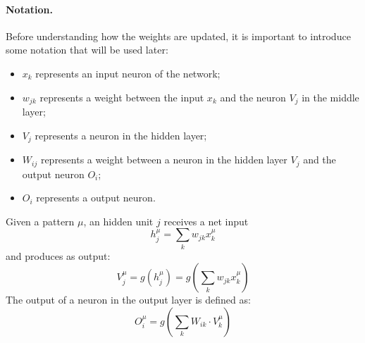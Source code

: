 \paragraph*{Notation.} Before understanding how the weights are updated, it is important to introduce some notation that will be used later:

\begin{itemize}
    \item $x_k$ represents an input neuron of the network;
    \item $w_{jk}$ represents a weight between the input $x_k$ and the neuron $V_j$ in the middle layer;
    \item $V_j$ represents a neuron in the hidden layer;
    \item $W_{ij}$ represents a weight between a neuron in the hidden layer $V_j$ and the output neuron $O_i$;
    \item $O_i$ represents a output neuron.
\end{itemize}


Given a pattern $\mu$, an hidden unit $j$ receives a net input
$$h _ { j } ^ { \mu } = \sum _ { k } w _ { j k } x _ { k } ^ { \mu }$$
and produces as output:
$$V _ { j } ^ { \mu } = g \left( h _ { j } ^ { \mu } \right) = g \left( \sum _ { k } w _ { j k } x _ { k } ^ { \mu } \right)$$
The output of a neuron in the output layer is defined as:
$$O _ {i} ^ {\mu} = g(\sum _ k W_{ik} \cdot V _ {k} ^ {\mu})$$


